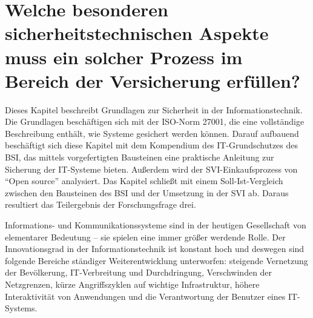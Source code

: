 \chapter[Forschungsfrage 3]{Welche besonderen sicherheitstechnischen Aspekte muss ein solcher Prozess im Bereich der Versicherung erfüllen?} \label{ff3}
Dieses Kapitel beschreibt Grundlagen zur Sicherheit in der Informationstechnik. Die Grundlagen beschäftigen sich mit der ISO-Norm 27001, die eine vollständige Beschreibung enthält, wie Systeme gesichert werden können. Darauf aufbauend beschäftigt sich diese Kapitel mit dem Kompendium des IT-Grundschutzes des \ac{BSI}, das mittels vorgefertigten Bausteinen eine praktische Anleitung zur Sicherung der IT-Systeme bieten. Außerdem wird der \ac{SVI}-Einkaufsprozess von \enquote{Open source} analysiert. Das Kapitel schließt mit einem Soll-Ist-Vergleich zwischen den Bausteinen des \ac{BSI} und der Umsetzung in der \ac{SVI} ab. Daraus resultiert das Teilergebnis der Forschungsfrage drei.
\par
Informations- und Kommunikationssysteme sind in der heutigen Gesellschaft von elementarer Bedeutung -- sie spielen eine immer größer werdende Rolle. Der Innovationsgrad in der Informationstechnik ist konstant hoch und deswegen sind folgende Bereiche ständiger Weiterentwicklung unterworfen: steigende Vernetzung der Bevölkerung, IT-Verbreitung und Durchdringung, Verschwinden der Netzgrenzen, kürze Angriffszyklen auf wichtige Infrastruktur, höhere Interaktivität von Anwendungen und die Verantwortung der Benutzer eines IT-Systems.\autocite[vgl.][S.\,2f.]{bundesamt_fur_sicherheit_in_der_informationstechnik_bsi_it-grundschutz-kompendium_2020}

